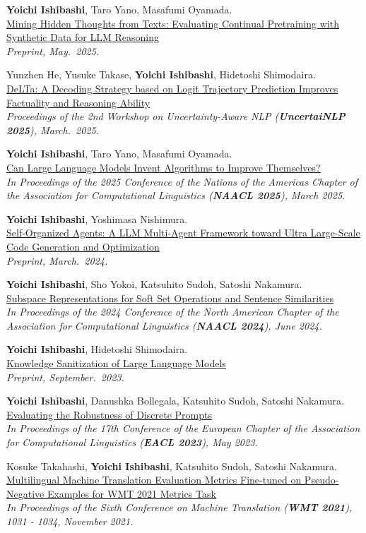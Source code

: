 \documentclass[11pt,letterpaper]{article}
\let\oldhref\href
\renewcommand{\href}[2]{\oldhref{#1}{\uline{#2}}}
\newcommand{\paper}[3]{\par\vspace{12pt}\noindent #1\\ #2\\ {\itshape #3}\par}
\begin{document}
\paper{\textbf{Yoichi Ishibashi}, Taro Yano, Masafumi Oyamada.}
{\href{https://arxiv.org/abs/2505.10182}{Mining Hidden Thoughts from Texts: Evaluating Continual Pretraining with Synthetic Data for LLM Reasoning}}
{Preprint, May.\ 2025.}

\paper{Yunzhen He, Yusuke Takase, \textbf{Yoichi Ishibashi}, Hidetoshi Shimodaira.}
{\href{https://arxiv.org/abs/2503.02343}{DeLTa: A Decoding Strategy based on Logit Trajectory Prediction Improves Factuality and Reasoning Ability}}
{Proceedings of the 2nd Workshop on Uncertainty-Aware NLP (\textbf{UncertaiNLP 2025}), March.\ 2025.}

\paper{\textbf{Yoichi Ishibashi}, Taro Yano, Masafumi Oyamada.}
{\href{https://arxiv.org/abs/2410.15639}{Can Large Language Models Invent Algorithms to Improve Themselves?}}
{In Proceedings of the 2025 Conference of the Nations of the Americas Chapter of the Association for Computational Linguistics (\textbf{NAACL 2025}), March 2025.}

\paper{\textbf{Yoichi Ishibashi}, Yoshimasa Nishimura.}
{\href{https://arxiv.org/abs/2404.02183}{Self-Organized Agents: A LLM Multi-Agent Framework toward Ultra Large-Scale Code Generation and Optimization}}
{Preprint, March.\ 2024.}

\paper{\textbf{Yoichi Ishibashi}, Sho Yokoi, Katsuhito Sudoh, Satoshi Nakamura.}
{\href{https://arxiv.org/abs/2210.13034}{Subspace Representations for Soft Set Operations and Sentence Similarities}}
{In Proceedings of the 2024 Conference of the North American Chapter of the Association for Computational Linguistics (\textbf{NAACL 2024}), June 2024.}

\paper{\textbf{Yoichi Ishibashi}, Hidetoshi Shimodaira.}
{\href{https://arxiv.org/abs/2309.11852}{Knowledge Sanitization of Large Language Models}}
{Preprint, September.\ 2023.}

\paper{\textbf{Yoichi Ishibashi}, Danushka Bollegala, Katsuhito Sudoh, Satoshi Nakamura.}
{\href{https://arxiv.org/abs/2302.05619}{Evaluating the Robustness of Discrete Prompts}}
{In Proceedings of the 17th Conference of the European Chapter of the Association for Computational Linguistics (\textbf{EACL 2023}), May 2023.}

\paper{Kosuke Takahashi, \textbf{Yoichi Ishibashi}, Katsuhito Sudoh, Satoshi Nakamura.}
{\href{http://www.statmt.org/wmt21/pdf/2021.wmt-1.113.pdf}{Multilingual Machine Translation Evaluation Metrics Fine-tuned on Pseudo-Negative Examples for WMT 2021 Metrics Task}}
{In Proceedings of the Sixth Conference on Machine Translation (\textbf{WMT 2021}), 1031 - 1034, November 2021.}
\end{document}
